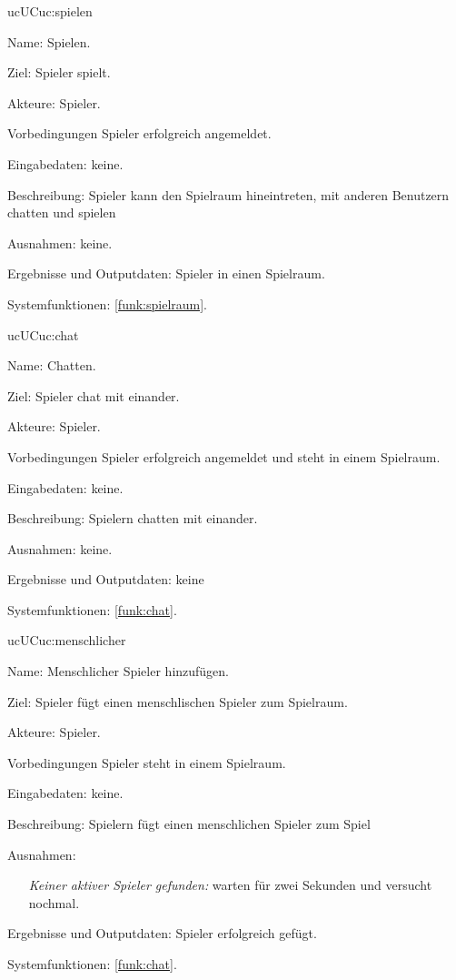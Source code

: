 \begin{description}[leftmargin=5em, style=sameline]
	\begin{lhp}{uc}{UC}{uc:spielen}
     	\item [Name:] Spielen.
    	\item [Ziel:] Spieler spielt.
	    \item [Akteure:] Spieler.
    	\item [Vorbedingungen] Spieler erfolgreich angemeldet.
    	\item [Eingabedaten:] keine.
    	\item [Beschreibung:] Spieler kann den Spielraum hineintreten, mit anderen Benutzern chatten und spielen	
    	\item [Ausnahmen:] keine.
    	\item [Ergebnisse und Outputdaten:] Spieler in einen Spielraum.
     	\item [Systemfunktionen:] \ref{funk:spielraum}.
    \end{lhp} 

    \begin{lhp}{uc}{UC}{uc:chat}
    	\item [Name:] Chatten.
    	\item [Ziel:] Spieler chat mit einander.
    	\item [Akteure:] Spieler.
    	\item [Vorbedingungen] Spieler erfolgreich angemeldet und steht in einem Spielraum. 
    	\item [Eingabedaten:] keine.
    	\item [Beschreibung:] Spielern chatten mit einander. 
    	\item [Ausnahmen:] keine.
    	\item [Ergebnisse und Outputdaten:] keine
    	\item [Systemfunktionen:] \ref{funk:chat}.
    \end{lhp}

    \begin{lhp}{uc}{UC}{uc:menschlicher}
    	\item [Name:] Menschlicher Spieler hinzufügen.
    	\item [Ziel:] Spieler fügt einen menschlischen Spieler zum Spielraum.
    	\item [Akteure:] Spieler.
    	\item [Vorbedingungen] Spieler steht in einem Spielraum. 
    	\item [Eingabedaten:] keine.
    	\item [Beschreibung:] Spielern fügt einen menschlichen Spieler zum Spiel
    	\item [Ausnahmen:] \hfill
    	    \begin{itemize} 
    		    \item[] \textit{Keiner aktiver Spieler gefunden:} warten für zwei Sekunden und versucht nochmal.    		
    	    \end{itemize}  
    	\item [Ergebnisse und Outputdaten:] Spieler erfolgreich gefügt.
    	\item [Systemfunktionen:] \ref{funk:chat}.
    \end{lhp}


\end{description}
